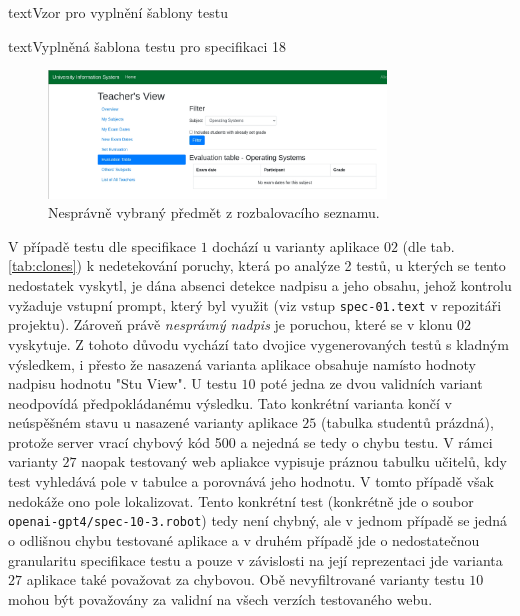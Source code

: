 \documentclass[czech, ma, kiv, he, iso690numb, pdf, viewonly]{fasthesis}
\begin{document}
\begin{code}{text}{Vzor pro vyplnění šablony testu \label{lst:template}}
{\begin{code}{text}{Vyplněná šablona testu pro specifikaci 18 \label{lst:spec18}}
{            \begin{figure}
                \includegraphics[width=0.8\textwidth]{pic/wrong_subject_select.png}
                \centering
                \caption{Nesprávně vybraný předmět z rozbalovacího seznamu.}
                \label{fig:wrong_subject_select}
            \end{figure}

            V případě testu dle specifikace \(1\) dochází u varianty aplikace \(02\) (dle tab. \ref{tab:clones}) k nedetekování poruchy, která po analýze 2 testů, u kterých se tento nedostatek vyskytl, je dána absenci detekce nadpisu a jeho obsahu, jehož kontrolu vyžaduje vstupní prompt, který byl využit (viz vstup \verb|spec-01.text| v repozitáři projektu). Zároveň právě \textit{nesprávný nadpis} je poruchou, které se v klonu \(02\) vyskytuje. Z tohoto důvodu vychází tato dvojice vygenerovaných testů s kladným výsledkem, i přesto že nasazená varianta aplikace obsahuje namísto hodnoty nadpisu  hodnotu "Stu View". U testu \(10\) poté jedna ze dvou validních variant neodpovídá předpokládanému výsledku. Tato konkrétní varianta končí v neúspěšném stavu u nasazené varianty aplikace \(25\) (tabulka studentů prázdná), protože server vrací chybový kód 500 a nejedná se tedy o chybu testu. V rámci varianty \(27\) naopak testovaný web apliakce vypisuje práznou tabulku učitelů, kdy test vyhledává pole v tabulce a porovnává jeho hodnotu. V tomto případě však nedokáže ono pole lokalizovat. Tento konkrétní test (konkrétně jde o soubor \verb|openai-gpt4/spec-10-3.robot|) tedy není chybný, ale v jednom případě se jedná o odlišnou chybu testované aplikace a v druhém případě jde o nedostatečnou granularitu specifikace testu a pouze v závislosti na její reprezentaci jde varianta \(27\) aplikace také považovat za chybovou. Obě nevyfiltrované varianty testu \(10\) mohou být považovány za validní na všech verzích testovaného webu. 


}
\end{code}}
\end{code}
\end{document}
